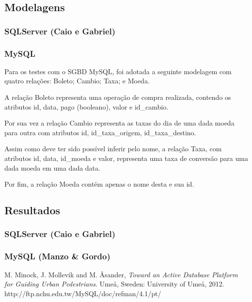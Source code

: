 \documentclass[conference]{IEEEtran}
\begin{document}
  \subsection{Modelagens}
    \subsubsection{SQLServer (Caio e Gabriel)}
    \subsubsection{MySQL}
    Para os testes com o SGBD MySQL, foi adotada a seguinte modelagem com quatro relações: Boleto; Cambio; Taxa; e Moeda.

    A relação Boleto representa uma operação de compra realizada, contendo os atributos id, data, pago (booleano), valor e id\_cambio.

    Por sua vez a relação Cambio representa as taxas do dia de uma dada moeda para outra com atributos id, id\_taxa\_origem, id\_taxa\_destino.

    Assim como deve ter sido possível inferir pelo nome, a relação Taxa, com atributos id, data, id\_moeda e valor, representa uma taxa de conversão para uma dada moeda em uma dada data.

    Por fim, a relação Moeda contém apenas o nome desta e sua id.

  \subsection{Resultados}
    \subsubsection{SQLServer (Caio e Gabriel)}
    \subsubsection{MySQL (Manzo \& Gordo)}


\begin{thebibliography}{1}

M. Minock, J. Mollevik and M. \r{A}sander, \textit{Toward an Active Database Platform for Guiding Urban Pedestrians}. Ume\r{a}, Sweden: University of Ume\r{a}, 2012.
http://ftp.nchu.edu.tw/MySQL/doc/refman/4.1/pt/
\end{thebibliography}
\end{document}
